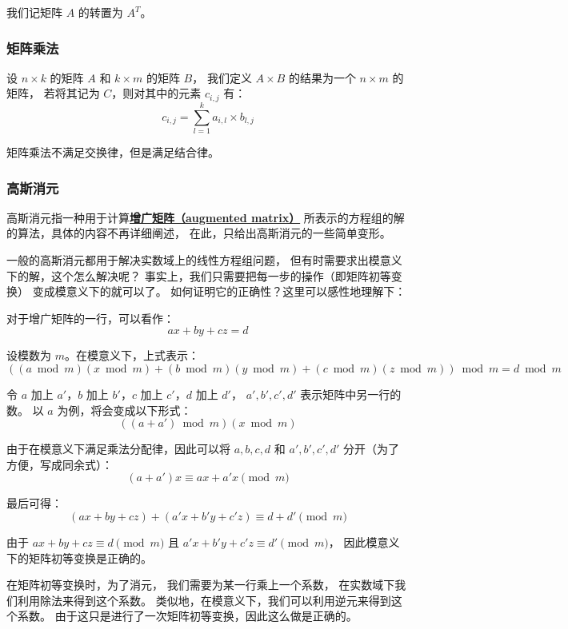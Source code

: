\documentclass[UTF8]{article}
\begin{document}
	我们记矩阵 $A$ 的转置为 $A^T$。

	\subsubsection{矩阵乘法}

	设 $n \times k$ 的矩阵 $A$ 和 $k \times m$ 的矩阵 $B$，
	我们定义 $A \times B$ 的结果为一个 $n \times m$ 的矩阵，
	若将其记为 $C$，则对其中的元素 $c_{i, j}$ 有：
	$$
	c_{i, j} = \sum_{l = 1}^{k} a_{i, l} \times b_{l, j}
	$$

	矩阵乘法不满足交换律，但是满足结合律。

	\subsubsection{高斯消元}

	高斯消元指一种用于计算\textbf{\uline{增广矩阵（augmented matrix）}}
	所表示的方程组的解的算法，具体的内容不再详细阐述，
	在此，只给出高斯消元的一些简单变形。

	\bigskip


	一般的高斯消元都用于解决实数域上的线性方程组问题，
	但有时需要求出模意义下的解，这个怎么解决呢？
	事实上，我们只需要把每一步的操作（即矩阵初等变换）
	变成模意义下的就可以了。
	如何证明它的正确性？这里可以感性地理解下：

	对于增广矩阵的一行，可以看作：
	$$
	ax + by + cz = d
	$$

	设模数为 $m$。在模意义下，上式表示：
	$$
	((a \bmod m)(x \bmod m) + (b \bmod m)(y \bmod m) +
	(c \bmod m)(z \bmod m)) \bmod m = d \bmod m
	$$

	令 $a$ 加上 $a'$，$b$ 加上 $b'$，$c$ 加上 $c'$，$d$ 加上 $d'$，
	$a', b', c', d'$ 表示矩阵中另一行的数。
	以 $a$ 为例，将会变成以下形式：
	$$
	((a + a') \bmod m)(x \bmod m)
	$$

	由于在模意义下满足乘法分配律，因此可以将 $a, b, c, d$ 和
	$a', b', c', d'$ 分开（为了方便，写成同余式）：
	$$
	(a + a')x \equiv a x + a' x \pmod m
	$$

	最后可得：
	$$
	(ax + by + cz) + (a'x + b'y + c'z) \equiv d + d' \pmod m
	$$

	由于 $ax + by + cz \equiv d \pmod m$ 且
	$a'x + b'y + c'z \equiv d' \pmod m$，
	因此模意义下的矩阵初等变换是正确的。

	\bigskip


	在矩阵初等变换时，为了消元，
	我们需要为某一行乘上一个系数，
	在实数域下我们利用除法来得到这个系数。
	类似地，在模意义下，我们可以利用逆元来得到这个系数。
	由于这只是进行了一次矩阵初等变换，因此这么做是正确的。
\end{document}
